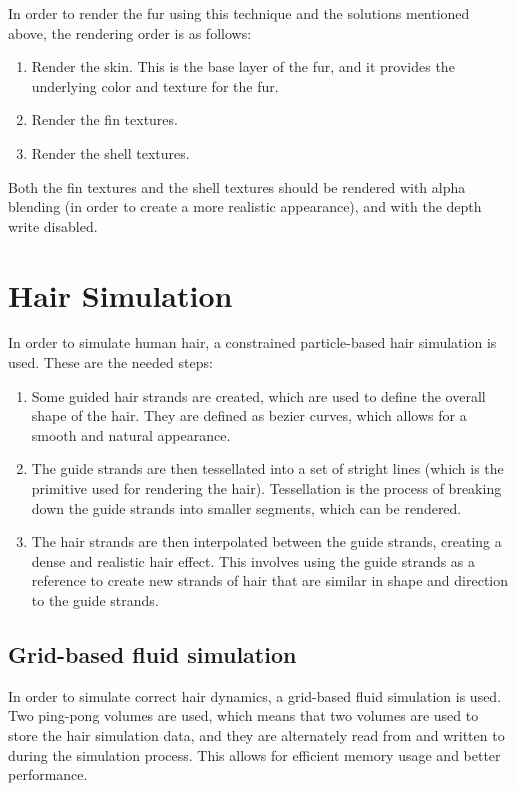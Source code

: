 In order to render the fur using this technique and the solutions mentioned above, the rendering order is as follows:
\begin{enumerate}
    \item Render the skin. This is the base layer of the fur, and it provides the underlying color and texture for the fur.
    \item Render the fin textures.
    \item Render the shell textures.
\end{enumerate}

Both the fin textures and the shell textures should be rendered with alpha blending (in order to create a more realistic appearance), and with the depth write disabled.

\section{Hair Simulation}

In order to simulate human hair, a constrained particle-based hair simulation is used. These are the needed steps:
\begin{enumerate}
    \item Some guided hair strands are created, which are used to define the overall shape of the hair. They are defined as bezier curves, which allows for a smooth and natural appearance.
    \item The guide strands are then tessellated into a set of stright lines (which is the primitive used for rendering the hair). Tessellation is the process of breaking down the guide strands into smaller segments, which can be rendered.
    \item The hair strands are then interpolated between the guide strands, creating a dense and realistic hair effect. This involves using the guide strands as a reference to create new strands of hair that are similar in shape and direction to the guide strands.
\end{enumerate}

\subsection{Grid-based fluid simulation}

In order to simulate correct hair dynamics, a grid-based fluid simulation is used. Two ping-pong volumes are used, which means that two volumes are used to store the hair simulation data, and they are alternately read from and written to during the simulation process. This allows for efficient memory usage and better performance.\\

